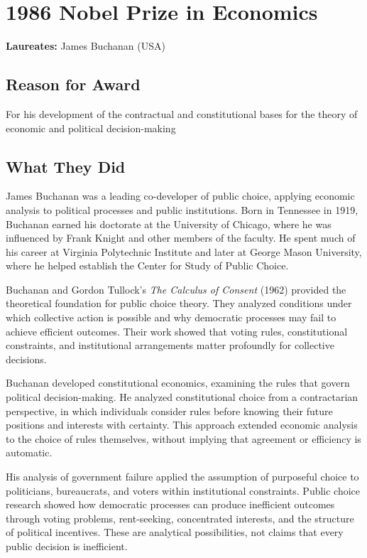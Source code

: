 \chapter{1986 Nobel Prize in Economics}
\textbf{Laureates: }James Buchanan (USA)

\section*{Reason for Award}
For his development of the contractual and constitutional bases for the theory
of economic and political decision-making

\section{What They Did}
James Buchanan was a leading co-developer of public choice, applying economic
analysis to political processes and public institutions. Born in Tennessee in
1919, Buchanan earned his doctorate at the University of Chicago, where he was
influenced by Frank Knight and other members of the faculty. He spent much of
his career at Virginia Polytechnic Institute and later at George Mason
University, where he helped establish the Center for Study of Public Choice.

Buchanan and Gordon Tullock's \textit{The Calculus of Consent} (1962) provided the
theoretical foundation for public choice theory. They analyzed conditions
under which collective action is possible and why democratic processes may
fail to achieve efficient outcomes. Their work showed that voting rules,
constitutional constraints, and institutional arrangements matter profoundly
for collective decisions.

Buchanan developed constitutional economics, examining the rules that govern
political decision-making. He analyzed constitutional choice from a
contractarian perspective, in which individuals consider rules before knowing
their future positions and interests with certainty. This approach extended
economic analysis to the choice of rules themselves, without implying that
agreement or efficiency is automatic.

His analysis of government failure applied the assumption of purposeful choice
to politicians, bureaucrats, and voters within institutional constraints.
Public choice research showed how democratic processes can produce inefficient
outcomes through voting problems, rent-seeking, concentrated interests, and
the structure of political incentives. These are analytical possibilities,
not claims that every public decision is inefficient.

